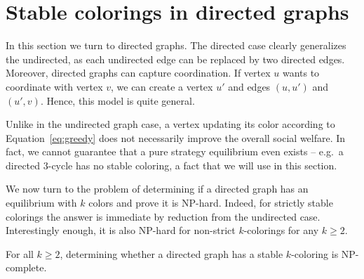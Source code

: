 \documentclass{llncs}
\begin{document}
\section{Stable colorings in directed graphs}

In this section we turn to directed graphs.  The directed case clearly
generalizes the undirected, as each undirected edge can be replaced by two
directed edges.  Moreover, directed graphs can capture coordination.  If vertex
$u$ wants to coordinate with vertex $v$, we can create a vertex $u'$ and edges
$(u,u')$ and $(u',v)$.  Hence, this model is quite general.

Unlike in the undirected graph case, a vertex updating its color according to
Equation~\ref{eq:greedy} does not necessarily improve the overall social
welfare. In fact, we cannot guarantee that a pure strategy equilibrium even
exists -- e.g.\ a directed $3$-cycle has no stable
coloring, a fact that we will use in this section.

We now turn to the problem of determining if a directed graph
has an equilibrium with $k$ colors and prove it is NP-hard.  Indeed, for
strictly stable colorings the answer is immediate by reduction from the
undirected case. Interestingly enough, it is also NP-hard for non-strict
$k$-colorings for any $k \geq 2$. 

\begin{theorem} 
For all $k \geq 2$, determining whether a directed graph has a
stable $k$-coloring is NP-complete.
\end{theorem}
\end{document}
